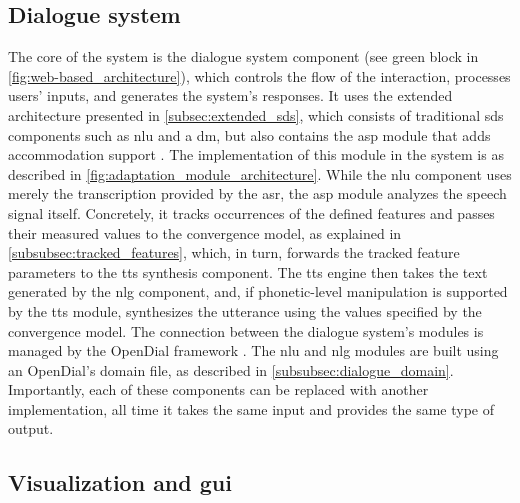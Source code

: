 \subsection{Dialogue system}
\label{subsec:dialogue_system}

The core of the system is the dialogue system component (see green block in \cref{fig:web-based_architecture}), which controls the flow of the interaction, processes users' inputs, and generates the system's responses.
It uses the extended architecture presented in \cref{subsec:extended_sds}, which consists of traditional \ac{sds} components such as \ac{nlu} and a \ac{dm}, but also contains the \ac{asp} module that adds accommodation support \citep{Raveh2017SemDial}.
The implementation of this module in the system is as described in \cref{fig:adaptation_module_architecture}.
While the \ac{nlu} component uses merely the transcription provided by the \ac{asr}, the \ac{asp} module analyzes the speech signal itself.
Concretely, it tracks occurrences of the defined features and passes their measured values to the convergence model, as explained in \cref{subsubsec:tracked_features}, which, in turn, forwards the tracked feature parameters to the \ac{tts} synthesis component.
The \ac{tts} engine then takes the text generated by the \ac{nlg} component, and, if phonetic-level manipulation is supported by the \ac{tts} module, synthesizes the utterance using the values specified by the convergence model.
The connection between the dialogue system's modules is managed by the OpenDial framework \citep{Lison2016opendial, Lison2015developing}.
The \ac{nlu} and \ac{nlg} modules are built using an OpenDial's domain file, as described in \cref{subsubsec:dialogue_domain}.
Importantly, each of these components can be replaced with another implementation, all time it takes the same input and provides the same type of output.

\subsection{Visualization and \acl{gui}}
\label{subsec:graphical_user_interface}

